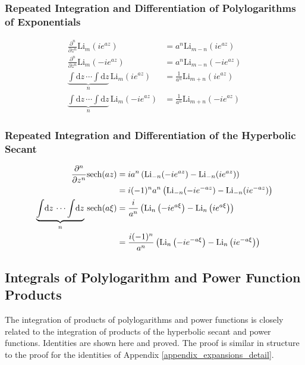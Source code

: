 \subsubsection{Repeated Integration and Differentiation of Polylogarithms of Exponentials}
\begin{align}
\frac{\partial^n}{\partial z^n} \mathrm{Li}_m (ie^{az}) &=
a^n \mathrm{Li}_{m-n}(ie^{az}) \\
\frac{\partial^n}{\partial z^n} \mathrm{Li}_m (-ie^{az}) &=
a^n \mathrm{Li}_{m-n}(-ie^{az}) \\
\underbrace{\int \! \mathrm{d}z \, \cdots \int \! \mathrm{d}z}_{n} \, \mathrm{Li}_m(ie^{az}) &=
\frac{1}{a^n}\mathrm{Li}_{m+n}(ie^{az}) \\
\underbrace{\int \! \mathrm{d}z \, \cdots \int \! \mathrm{d}z}_{n} \, \mathrm{Li}_m(-ie^{az}) &=
\frac{1}{a^n}\mathrm{Li}_{m+n}(-ie^{az})
\end{align}

\subsubsection{Repeated Integration and Differentiation of the Hyperbolic Secant}
\begin{align}
	\frac{\partial^n}{\partial z^n} \mathrm{sech}(az)
	&= ia^n\left(\mathrm{Li}_{-n}(-ie^{az}) - \mathrm{Li}_{-n}(ie^{az})\right) \\
	&= i(-1)^n a^n\left(\mathrm{Li}_{-n}(-ie^{-az}) - \mathrm{Li}_{-n}(ie^{-az})\right) \\
	\underbrace{\int \! \mathrm{d}z \, \cdots \int \! \mathrm{d}z}_{n} \, \operatorname{sech}(a\xi)
	&= \frac{i}{a^n}\left(\operatorname{Li}_n\left(-ie^{a\xi}\right)-\operatorname{Li}_n\left(ie^{a\xi}\right)\right) \\
	&= \frac{i(-1)^n}{a^n}\left(\operatorname{Li}_n\left(-ie^{-a\xi}\right)-\operatorname{Li}_n\left(ie^{-a\xi}\right)\right)
\end{align}

\subsection{Integrals of Polylogarithm and Power Function Products}
\label{polylog_power_function_proof}
The integration of products of polylogarithms and power functions is closely related to the integration of products of the hyperbolic secant and power functions.  Identities are shown here and proved.  The proof is similar in structure to the proof for the identities of Appendix \ref{appendix_expansions_detail}.
